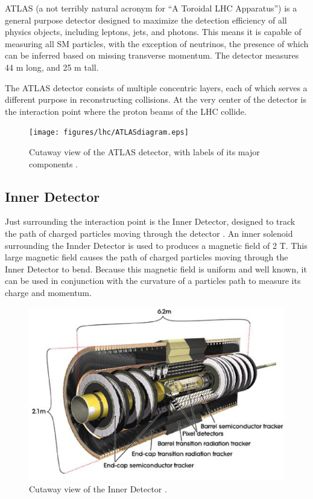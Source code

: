 ATLAS (a not terribly natural acronym for ``A Toroidal LHC Apparatus'') is a general purpose detector designed to maximize the detection efficiency of all physics objects, including leptons, jets, and photons. This means it is capable of measuring all SM particles, with the exception of neutrinos, the presence of which can be inferred based on missing transverse momentum. The detector measures 44 m long, and 25 m tall. 

The ATLAS detector consists of multiple concentric layers, each of which serves a different purpose in reconstructing collisions. At the very center of the detector is the interaction point where the proton beams of the LHC collide. 

\begin{figure}[H]
\centering
   \texttt{[image: figures/lhc/ATLASdiagram.eps]}
\caption{Cutaway view of the ATLAS detector, with labels of its major components \cite{ATLAS_figure}.}
\label{fig:ATLAS}
\end{figure}

\subsection{Inner Detector}
\label{sec:innerDetector}

Just surrounding the interaction point is the Inner Detector, designed to track the path of charged particles moving through the detector \cite{IDET-2010-01}. An inner solenoid surrounding the Innder Detector is used to produces a magnetic field of 2 T. This large magnetic field causes the path of charged particles moving through the Inner Detector to bend. Because this magnetic field is uniform and well known, it can be used in conjunction with the curvature of a particles path to measure its charge and momentum.

\begin{figure}[H]
\centering
   \includegraphics[width=0.75\linewidth]{figures/lhc/InnerDetector.eps}
\caption{Cutaway view of the Inner Detector \cite{caloFig}.}
\label{fig:innerDect}
\end{figure}

